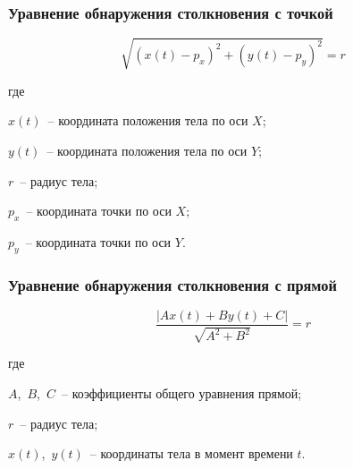 \documentclass[xetex,aspectratio=43]{beamer}
\newenvironment{Underequation}{
    \small
    \noindent
    где
    \hspace{-1.45ex}
    \setlength{\parindent}{3.5ex}
}{}
\begin{document}
\begin{frame}
    \frametitle{Уравнение обнаружения столкновения с точкой}

    \begin{equation}\label{bodypointcollisioncoords}
        \sqrt{(x(t) - p_x)^2 + (y(t) - p_y)^2} = r
    \end{equation}

    \begin{Underequation}
        \(x(t)\)~-- координата положения тела по оси \(X\);

        \(y(t)\)~-- координата положения тела по оси \(Y\);

        \(r\)~-- радиус тела;

        \(p_x\)~-- координата точки по оси \(X\);

        \(p_y\)~-- координата точки по оси \(Y\).
    \end{Underequation}
\end{frame}

\begin{frame}
    \frametitle{Уравнение обнаружения столкновения с прямой}

    \begin{equation}\label{bodylinecolision}
        \frac{\left|A x(t) + B y(t) + C\right|}{\sqrt{A^2 + B^2}} = r
    \end{equation}

    \begin{Underequation}
        \(A\),~\(B\),~\(C\)~-- коэффициенты общего уравнения прямой;

        \(r\)~-- радиус тела;

        \(x(t)\),~\(y(t)\)~-- координаты тела в момент времени \(t\).
    \end{Underequation}

\end{frame}
\end{document}
